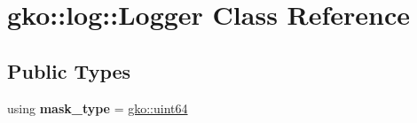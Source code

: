 \hypertarget{classgko_1_1log_1_1Logger}{}\section{gko\+:\+:log\+:\+:Logger Class Reference}
\label{classgko_1_1log_1_1Logger}
\subsection*{Public Types}
\begin{DoxyCompactItemize}
\item 
\mbox{\label{classgko_1_1log_1_1Logger_a589684bdf0d11750646babdab4328adc}} 
using {\bfseries mask\+\_\+type} = \hyperlink{namespacegko_ad54a79afecd57aabbb04b1dc611ae55e}{gko\+::uint64}
\end{DoxyCompactItemize}
